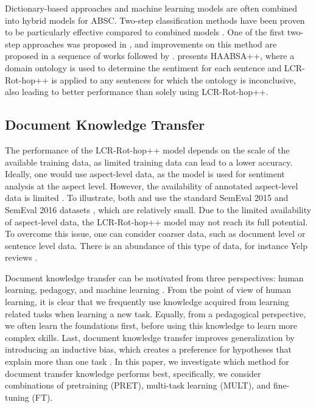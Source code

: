 \documentclass[runningheads]{llncs}
\begin{document}
Dictionary-based approaches and machine learning models are often combined into hybrid models for ABSC. Two-step classification methods have been proven to be particularly effective compared to combined models  \cite{Cambria2018,Chikersal2015,Schouten2016,Schouten2017,Wallaart2019}. One of the first two-step approaches was proposed in \cite{Chikersal2015}, and improvements on this method are proposed in a sequence of works \cite{Schouten2016,Schouten2017,Wallaart2019} followed by \cite{Trusca2020}. \cite{Trusca2020} presents HAABSA++, where a domain ontology is used to determine the sentiment for each sentence and LCR-Rot-hop++ is applied to any sentences for which the ontology is inconclusive, also leading to better performance than solely using LCR-Rot-hop++.

\subsection{Document Knowledge Transfer} 

The performance of the LCR-Rot-hop++ model depends on the scale of the available training data, as limited training data can lead to a lower accuracy. Ideally, one would use aspect-level data, as the model is used for sentiment analysis at the aspect level. However, the availability of annotated aspect-level data is limited \cite{pan2010, He2018}. To illustrate, both \cite{Trusca2020} and \cite{Wallaart2019} use the standard SemEval 2015 and SemEval 2016 datasets \cite{SemEval2015, SemEval2016}, which are relatively small. Due to the limited availability of aspect-level data, the LCR-Rot-hop++ model may not reach its full potential. To overcome this issue, one can consider coarser data, such as document level or sentence level data. There is an abundance of this type of data, for instance Yelp reviews \cite{Tang2015}. 

Document knowledge transfer can be motivated from three perspectives: human learning, pedagogy, and machine learning \cite{Ruder2019}. From the point of view of human learning, it is clear that we frequently use knowledge acquired from learning related tasks when learning a new task. Equally, from a pedagogical perspective, we often learn the foundations first, before using this knowledge to learn more complex skills. Last, document knowledge transfer improves generalization by introducing an inductive bias, which creates a preference for hypotheses that explain more than one task \cite{Caruana1993}. In this paper, we investigate which method for document transfer knowledge performs best, specifically, we consider combinations of pretraining (PRET), multi-task learning (MULT), and fine-tuning (FT). 
\end{document}
